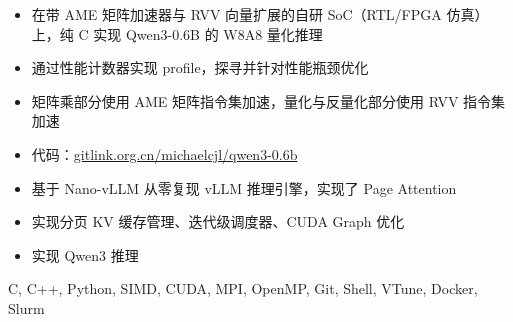 
\begin{itemize}
  \item 在带 AME 矩阵加速器与 RVV 向量扩展的自研 SoC（RTL/FPGA 仿真）上，纯 C 实现 Qwen3-0.6B 的 W8A8 量化推理
  \item 通过性能计数器实现 profile，探寻并针对性能瓶颈优化
  \item 矩阵乘部分使用 AME 矩阵指令集加速，量化与反量化部分使用 RVV 指令集加速
  \item 代码：\href{https://www.gitlink.org.cn/michaelcjl/qwen3-0.6b}{gitlink.org.cn/michaelcjl/qwen3-0.6b}
\end{itemize}

\begin{itemize}
  \item 基于 Nano-vLLM 从零复现 vLLM 推理引擎，实现了 Page Attention
  \item 实现分页 KV 缓存管理、迭代级调度器、CUDA Graph 优化
  \item 实现 Qwen3 推理
\end{itemize}


C, C++, Python, SIMD, CUDA, MPI, OpenMP, Git, Shell, VTune, Docker, Slurm